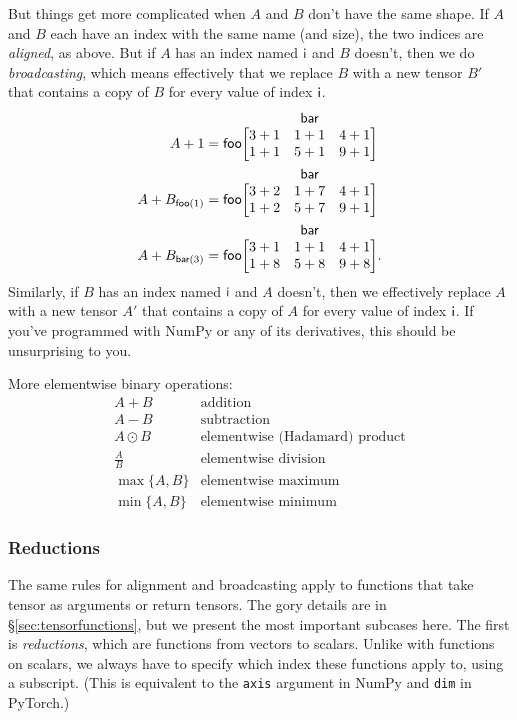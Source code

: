 \documentclass{article}
\makeatletter
\newcommand{\nmatrix}[3]{\name{#1}\begin{array}[b]{@{}c@{}}\name{#2}\\\begin{bmatrix}#3\end{bmatrix}\end{array}}
\makeatother
\begin{document}
But things get more complicated when $A$ and $B$ don't have the same shape. If $A$ and $B$ each have an index with the same name (and size), the two indices are \emph{aligned}, as above. But if $A$ has an index named $\mathsf{i}$ and $B$ doesn't, then we do \emph{broadcasting}, which means effectively that we replace $B$ with a new tensor $B'$ that contains a copy of $B$ for every value of index $\mathsf{i}$.
\begin{align*}
A + 1 &= \nmatrix{foo}{bar}{
  3+1 & 1+1 & 4+1 \\
  1+1 & 5+1 & 9+1
} \\
A + B_{\nidx{foo}{1}} &= \nmatrix{foo}{bar}{
  3+2 & 1+7 & 4+1 \\
  1+2 & 5+7 & 9+1
} \\
A + B_{\nidx{bar}{3}} &= \nmatrix{foo}{bar}{
  3+1 & 1+1 & 4+1 \\
  1+8 & 5+8 & 9+8
}.
\end{align*}
Similarly, if $B$ has an index named $\mathsf{i}$ and $A$ doesn't, then we effectively replace $A$ with a new tensor $A'$ that contains a copy of $A$ for every value of index $\mathsf{i}$. If you've programmed with NumPy or any of its derivatives, this should be unsurprising to you.

More elementwise binary operations:
\[\begin{array}{cl}
A+B & \text{addition} \\
A-B & \text{subtraction} \\
A\odot B & \text{elementwise (Hadamard) product} \\
\displaystyle\frac{A}{B} & \text{elementwise division} \\[1.2ex]
\max \{A, B\} & \text{elementwise maximum} \\
\min \{A, B\} & \text{elementwise minimum}
\end{array}\]

\subsubsection{Reductions}

The same rules for alignment and broadcasting apply to functions that take tensor as arguments or return tensors. The gory details are in \S\ref{sec:tensorfunctions}, but we present the most important subcases here. The first is \emph{reductions}, which are functions from vectors to scalars. Unlike with functions on scalars, we always have to specify which index these functions apply to, using a subscript. (This is equivalent to the \verb|axis| argument in NumPy and \verb|dim| in PyTorch.)
\end{document}

